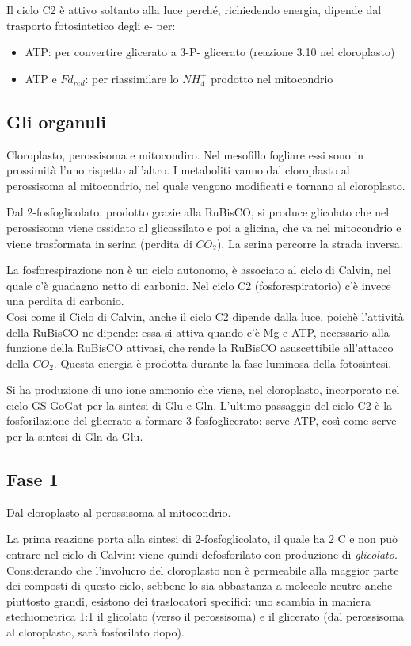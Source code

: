\documentclass[a4paper,12pt]{book}
\begin{document}
Il ciclo C2 è attivo soltanto alla luce
perché, richiedendo energia, dipende
dal trasporto fotosintetico degli e- per:
\begin{itemize}
\item{ATP: per convertire glicerato a 3-P-
glicerato (reazione 3.10 nel cloroplasto)}
\item{ATP e $Fd_{red}$: per riassimilare lo $NH_{4}^{+}$
prodotto nel mitocondrio }
\end{itemize}

\subsection{Gli organuli}
Cloroplasto, perossisoma e mitocondiro. Nel mesofillo fogliare essi sono in prossimità l'uno rispetto all'altro. I metaboliti vanno dal cloroplasto al perossisoma al mitocondrio, nel quale vengono modificati e tornano al cloroplasto.

Dal 2-fosfoglicolato, prodotto grazie alla RuBisCO, si produce glicolato che nel perossisoma viene ossidato al glicossilato e poi a glicina, che va nel mitocondrio e viene trasformata in serina (perdita di $CO_{2}$). La serina percorre la strada inversa.

La fosforespirazione non è un ciclo autonomo, è associato al ciclo di Calvin, nel quale c'è guadagno netto di carbonio. Nel ciclo C2 (fosforespiratorio) c'è invece una perdita di carbonio.
\\
Così come il Ciclo di Calvin, anche il ciclo C2 dipende dalla luce, poichè l'attività della RuBisCO ne dipende: essa si attiva quando c'è Mg e ATP, necessario alla funzione della RuBisCO attivasi, che rende la RuBisCO asuscettibile all'attacco della $CO_{2}$. Questa energia è prodotta durante la fase luminosa della fotosintesi.

Si ha produzione di uno ione ammonio che viene, nel cloroplasto, incorporato nel ciclo GS-GoGat per la sintesi di Glu e Gln. 
L'ultimo passaggio del ciclo C2 è la fosforilazione del glicerato a formare 3-fosfoglicerato: serve ATP, così come serve per la sintesi di Gln da Glu.

\subsection{Fase 1}
Dal cloroplasto al perossisoma al mitocondrio.

La prima reazione porta alla sintesi di 2-fosfoglicolato, il quale ha 2 C e non può entrare nel ciclo di Calvin: viene quindi defosforilato con produzione di \emph{glicolato}. Considerando che l'involucro del cloroplasto non è permeabile alla maggior parte dei composti di questo ciclo, sebbene lo sia abbastanza a molecole neutre anche piuttosto grandi, esistono dei traslocatori specifici: uno scambia in maniera stechiometrica 1:1 il glicolato (verso il perossisoma) e il glicerato (dal perossisoma al cloroplasto, sarà fosforilato dopo). 
\end{document}
